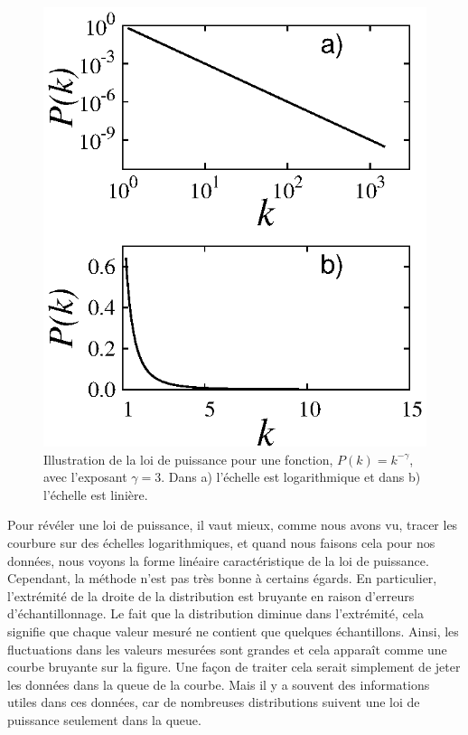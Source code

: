 \begin{figure}[h!]
	\centering
	\includegraphics[scale=1.2]{./figures/fig-sans-echelle}
	\caption{Illustration de la loi de puissance pour une fonction, $P(k)=k^{-\gamma}$, avec l'exposant $\gamma=3$. Dans a) l'échelle est logarithmique et dans b) l'échelle est linière.}
	\label{sans-echelle-3}
\end{figure}
Pour révéler une loi de puissance, il vaut mieux, comme nous avons vu, tracer les courbure sur des échelles logarithmiques, et quand nous faisons cela pour nos données, nous voyons la forme linéaire caractéristique de la loi de puissance.
Cependant, la méthode n'est pas très bonne à certains égards. En particulier, l'extrémité de la droite de la distribution est bruyante en raison d'erreurs d'échantillonnage. Le fait que la distribution diminue dans l'extrémité, cela signifie que chaque valeur mesuré ne contient que quelques échantillons. Ainsi, les fluctuations dans les valeurs mesurées sont grandes et cela apparaît comme une courbe bruyante sur la figure. Une façon de traiter cela serait simplement de jeter les données dans la queue de la courbe. Mais il y a souvent des informations utiles dans ces données, car de nombreuses distributions suivent une loi de puissance seulement dans la queue.


